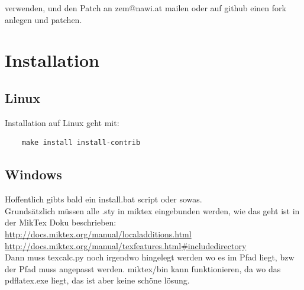 \documentclass[a4paper]{article}
\begin{document}
verwenden, und den Patch an zem@nawi.at mailen oder auf github einen fork
anlegen und patchen.


\section{Installation}

\subsection{Linux}

Installation auf Linux geht mit:

\begin{verbatim}
	make install install-contrib
\end{verbatim}

\subsection{Windows}

Hoffentlich gibts bald ein install.bat script oder sowas. \\

Grundsätzlich müssen alle .sty in miktex eingebunden werden, wie das
geht ist in der MikTex Doku beschrieben:\\

\url{http://docs.miktex.org/manual/localadditions.html}\\
\url{http://docs.miktex.org/manual/texfeatures.html#includedirectory}\\

%
%

Dann muss texcalc.py noch irgendwo hingelegt werden wo es im Pfad liegt, bzw
der Pfad muss angepasst werden. miktex/bin kann funktionieren, da wo das pdflatex.exe
liegt, das ist aber keine schöne lösung.\\
\end{document}
